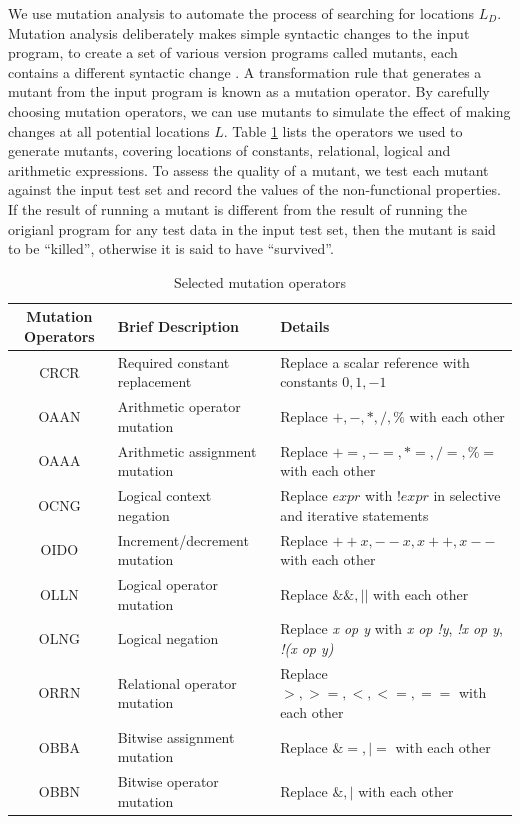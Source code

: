 We use mutation analysis to automate the process of searching for locations $L_D$. Mutation analysis deliberately makes simple syntactic changes to the input program, to create a set of various version programs called mutants, each contains a different syntactic change \cite{5487526}. A transformation rule that generates a mutant from the input program is known as a mutation operator. By carefully choosing mutation operators, we can use mutants to simulate the effect of making changes at all potential locations $L$. Table \ref{tab:cmop} lists the operators we used to generate mutants, covering locations of constants, relational, logical and arithmetic expressions. 
To assess the quality of a mutant, we test each mutant against the input test set and record the values of the non-functional properties. If the result of running a mutant is different from the result of running the origianl program for any test data in the input test set, then the mutant is said to be ``killed'', otherwise it is said to have ``survived''. 

\begin{table} [ht]
\caption{Selected mutation operators}
\label{tab:cmop} 
\begin{center}
\begin{tabular}{ | c | l | l |}
  \hline
  Mutation Operators & Brief Description & Details \\ 
\hline
  CRCR & Required constant replacement & Replace a scalar reference with constants $0, 1, -1$ \\
  OAAN & Arithmetic operator mutation & Replace $+, -, *, /, \%$ with each other \\
  OAAA & Arithmetic assignment mutation & Replace $+=, -=, *=, /=, \%=$ with each other \\
  OCNG & Logical context negation & Replace $expr$ with $!expr$ in selective and iterative statements\\
  OIDO & Increment/decrement mutation  & Replace $++x, --x, x++, x--$ with each other \\
  OLLN & Logical operator mutation  & Replace $\&\&, ||$ with each other \\ 
  OLNG & Logical negation & Replace \emph{x op y} with \emph{x op !y}, \emph{!x op y}, \emph{!(x op y)}\\
  ORRN & Relational operator mutation & Replace $>, >=, <, <=, ==$ with each other \\
  OBBA & Bitwise assignment mutation & Replace $\&=, |=$ with each other \\
  OBBN & Bitwise operator mutation & Replace $\&, |$ with each other \\
\hline
\end{tabular} 
\end{center} 
\end{table} 


